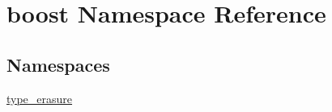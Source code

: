 \hypertarget{namespaceboost}{}\section{boost Namespace Reference}
\label{namespaceboost}
\subsection*{Namespaces}
\begin{DoxyCompactItemize}
\item 
 \mbox{\hyperlink{namespaceboost_1_1type__erasure}{type\+\_\+erasure}}
\end{DoxyCompactItemize}
